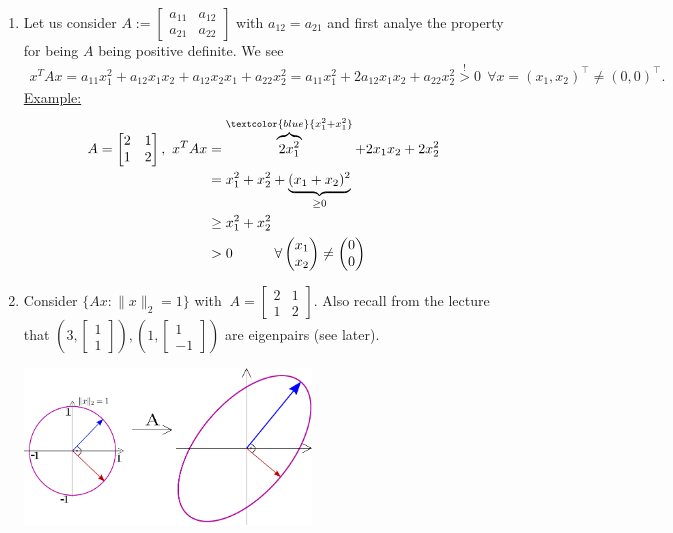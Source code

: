 \begin{enumerate}
	\item  Let us consider $A:= \begin{bmatrix}a_{11}&a_{12}\\a_{21}&a_{22}\end{bmatrix} $ with $a_{12} = a_{21}$ and first analye the property for being $A$ being positive definite. We see
	\begin{align*}
		x^TAx=a_{11}x_1^2+a_{12}x_1x_2+a_{12}x_2x_1+a_{22}x_2^2
		=a_{11}x_1^2+2a_{12}x_1x_2+a_{22}x_2^2
		\stackrel{!}{>} 0\ \ \forall x=(x_1,x_2)^\top\neq (0,0)^\top.
		\end{align*}
	\underline{Example:}
	\begin{align*}
		A=\begin{bmatrix}2&1\\1&2\end{bmatrix},~ x^TAx &=\overbrace{2x_1^2}^{\textcolor{blue}{x_1^2+x_1^2}}+2x_1x_2+2x_2^2\\
		&=x_1^2+x_2^2+\underbrace{(x_1+x_2)^2}_{\geq0}\\
		&\geq x_1^2+x_2^2\\
		&>0~~~~~~~~~ \forall\begin{pmatrix}x_1\\x_2\end{pmatrix}\neq\begin{pmatrix}0\\0\end{pmatrix}
		\end{align*}
	\item  Consider
	$\{Ax:\|{x}\|_2 =1\}$ with $\ A=\begin{bmatrix}2&1\\1&2\end{bmatrix}$. Also recall from the lecture that $\left(3, \begin{bmatrix}1\\1\end{bmatrix}\right), \left(1, \begin{bmatrix}1\\-1\end{bmatrix}\right)$ are eigenpairs (see later).
	\begin{center}
		\includegraphics[width=0.6\textwidth]{spdMatrix.pdf}

\end{center}
\end{enumerate}
